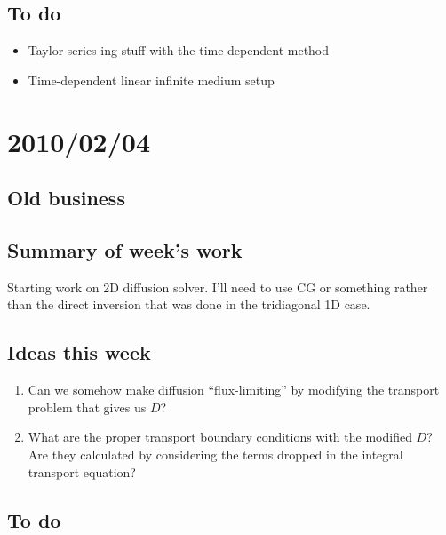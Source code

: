 \documentclass[11pt]{SRJresearch}
\begin{document}
\subsection{To do}
\begin{itemize}
  \item Taylor series-ing stuff with the time-dependent method

  \item Time-dependent linear infinite medium setup
\end{itemize}
\section{2010/02/04}

\subsection{Old business}

\subsection{Summary of week's work}
Starting work on 2D diffusion solver. I'll need to use CG or something rather
than the direct inversion that was done in the tridiagonal 1D case.

\subsection{Ideas this week}
\begin{enumerate}
\item Can we somehow make diffusion ``flux-limiting'' by modifying the transport
problem that gives us $D$?

\item What are the proper transport boundary conditions with the modified $D$?
  Are they calculated by considering the terms dropped in the integral
  transport equation?

\end{enumerate}

\subsection{To do}


\end{document}
